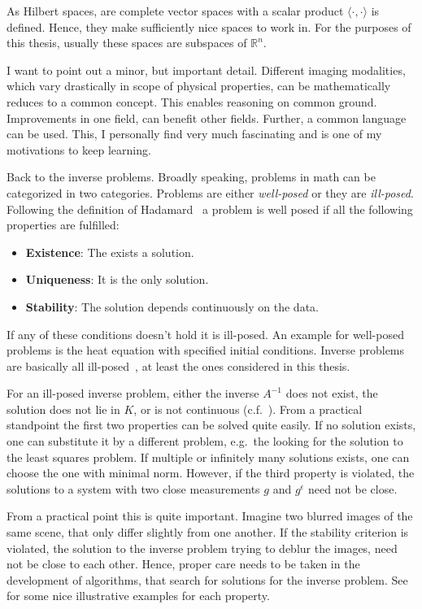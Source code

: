 As Hilbert spaces, are complete vector spaces with a scalar product \(\langle\cdot,\cdot\rangle\)
is defined. Hence, they make sufficiently nice spaces to work in. For the purposes of this thesis,
usually these spaces are subspaces of \(\mathbb{R}^n\).

I want to point out a minor, but important detail. Different imaging modalities, which vary
drastically in scope of physical properties, can be mathematically reduces to a common concept. This
enables reasoning on common ground. Improvements in one field, can benefit other fields. Further, a
common language can be used. This, I personally find very much fascinating and is one of my
motivations to keep learning.

Back to the inverse problems. Broadly speaking, problems in math can be categorized in two
categories. Problems are either \textit{well-posed} or they are \textit{ill-posed}. Following the
definition of Hadamard~\cite{hadamard_sur_1902} a problem is well posed if all the following
properties are fulfilled:

\begin{itemize}
	\item \textbf{Existence}: The exists a solution.
	\item \textbf{Uniqueness}: It is the only solution.
	\item \textbf{Stability}: The solution depends continuously on the data.
\end{itemize}

If any of these conditions doesn't hold it is ill-posed. An example for well-posed problems is the
heat equation with specified initial conditions. Inverse problems are basically all
ill-posed~\cite{hansen_discrete_2010}, at least the ones considered in this thesis.

For an ill-posed inverse problem, either the inverse \(A^{-1}\) does not exist, the solution does
not lie in \(K\), or is not continuous (c.f.~\cite[Chapter~4]{natterer_mathematics_1986}). From a
practical standpoint the first two properties can be solved quite easily. If no solution exists, one
can substitute it by a different problem, e.g.\ the looking for the solution to the least squares
problem. If multiple or infinitely many solutions exists, one can choose the one with minimal norm.
However, if the third property is violated, the solutions to a system with two close measurements
\(g\) and \(g^\epsilon\) need not be close.

From a practical point this is quite important. Imagine two blurred images of the same scene, that
only differ slightly from one another. If the stability criterion is violated, the solution to the
inverse problem trying to deblur the images, need not be close to each other. Hence, proper care
needs to be taken in the development of algorithms, that search for solutions for the inverse
problem. See \citeauthor{hansen_discrete_2010}\cite{hansen_discrete_2010} for some nice illustrative
examples for each property.

